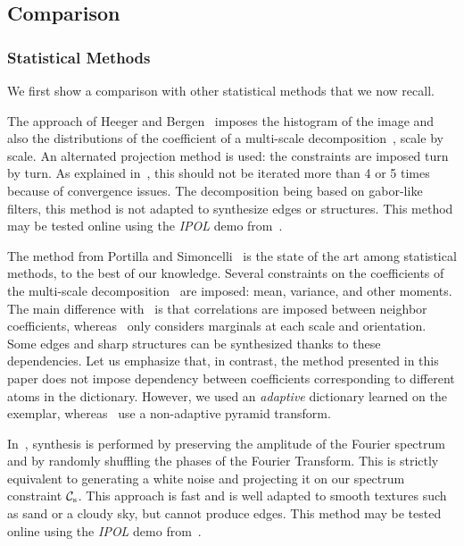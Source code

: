 \subsection{Comparison}

\subsubsection{Statistical Methods}

We first show a comparison with other statistical methods that we now recall.

The approach of Heeger and Bergen~\cite{Heeger1995} imposes the histogram of the image and also the distributions of the coefficient of a multi-scale decomposition~\cite{simoncelli1992shiftable}, scale by scale.
An alternated projection method is used: the constraints are imposed turn by turn.
As explained in~\cite{Heeger1995}, this should not be iterated more than 4 or 5 times because of convergence issues.
The decomposition being based on gabor-like filters, this method is not adapted to synthesize edges or structures.
This method may be tested online using the {\it IPOL} demo from~\cite{ipol:heeger}.

The method from Portilla and Simoncelli~\cite{portilla2000parametric} is the state of the art among statistical methods, to the best of our know\-ledge.
Several constraints on the coefficients of the multi-scale decomposition~\cite{simoncelli1992shiftable} are imposed: mean, variance, and other moments.
The main difference with~\cite{Heeger1995} is that correlations are imposed between neighbor coefficients, where\-as~\cite{Heeger1995} only considers marginals at each scale and orientation.
Some edges and sharp structures can be synthesized thanks to these dependencies.
Let us emphasize that, in contrast, the method presented in this paper does not impose dependency between coefficients corresponding to different atoms in the dictionary.
However, we used an {\it adaptive} dictionary learned on the exemplar, whereas~\cite{Heeger1995,portilla2000parametric} use a non-adaptive pyramid transform.

In~\cite{galerne2011random}, synthesis is performed by preserving the amplitude of the Fourier spectrum and by randomly shuffling the phases of the Fourier Transform.
This is strictly equivalent to generating a white noise and projecting it on our spectrum constraint ${\mathcal{C}_{\mathrm{s}}}$.
This approach is fast and is well adapted to smooth textures such as sand or a cloudy sky, but cannot produce edges.
This method may be tested online using the {\it IPOL} demo from~\cite{ipol:galerne}.

